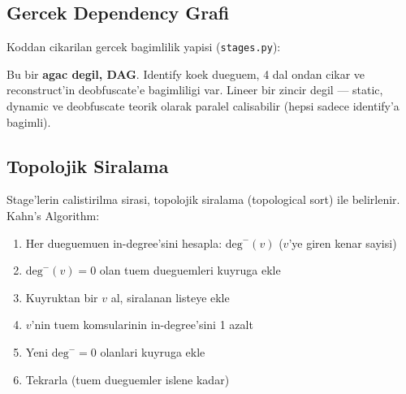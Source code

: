 \documentclass[12pt,a4paper,oneside]{book}
\theoremstyle{definition}
\newcommand{\file}[1]{\texttt{\color{yellow!70!white}#1}}
\begin{document}
\subsection{Gercek Dependency Grafi}

Koddan cikarilan gercek bagimlilik yapisi (\file{stages.py}):

\begin{center}
\end{center}

Bu bir \textbf{agac degil, DAG}. Identify koek dueguem, 4 dal ondan cikar ve reconstruct'in deobfuscate'e bagimliligi var. Lineer bir zincir degil --- static, dynamic ve deobfuscate teorik olarak paralel calisabilir (hepsi sadece identify'a bagimli).

\subsection{Topolojik Siralama}

Stage'lerin calisti\-rilma siras\-i, topolojik siralama (topological sort) ile belirlenir. Kahn's Algorithm:

\begin{enumerate}
\item Her dueguemuen in-degree'sini hesapla: $\text{deg}^-(v)$ ($v$'ye giren kenar sayisi)
\item $\text{deg}^-(v) = 0$ olan tuem dueguemleri kuyru\-ga ekle
\item Kuyruktan bir $v$ al, siralanan listeye ekle
\item $v$'nin tuem komsularinin in-degree'sini 1 azalt
\item Yeni $\text{deg}^- = 0$ olanlari kuyru\-ga ekle
\item Tekrarla (tuem dueguemler islene kadar)
\end{enumerate}
\end{document}
